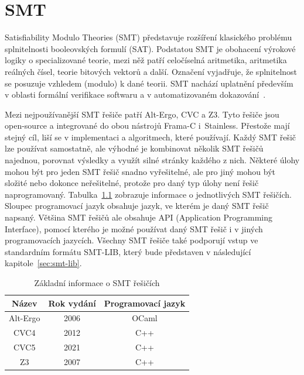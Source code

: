 \chapter{SMT}
\label{ch:smt}

Satisfiability Modulo Theories (SMT) představuje rozšíření klasického problému splnitelnosti booleovských formulí (SAT).
Podstatou SMT je obohacení výrokové logiky o specializované teorie,
mezi něž patří celočíselná aritmetika, aritmetika reálných čísel, teorie bitových vektorů a další.
Označení  vyjadřuje, že splnitelnost se posuzuje vzhledem (modulo) k dané teorii.
SMT nachází uplatnění především v oblasti formální verifikace softwaru a v automatizovaném dokazování~\cite{SMT}.

Mezi nejpoužívanější SMT řešiče patří Alt-Ergo, CVC a Z3.
Tyto řešiče jsou open-source a integrované do obou nástrojů Frama\mbox{-}C i~Stainless.
Přestože mají stejný cíl, liší se v implementaci a algoritmech, které používají.
Každý SMT řešič lze používat samostatně,
ale výhodné je kombinovat několik SMT řešičů najednou, porovnat výsledky a využít silné stránky každého z nich.
Některé úlohy mohou být pro jeden SMT řešič snadno vyřešitelné,
ale pro jiný mohou být složité nebo dokonce neřešitelné,
protože pro daný typ úlohy není řešič naprogramovaný.
Tabulka~\ref{tab:smt-resice} zobrazuje informace o jednotlivých SMT řešičích.
Sloupec programovací jazyk obsahuje jazyk, ve kterém je daný SMT řešič napsaný.
Většina SMT řešičů ale obsahuje API (Application Programming Interface),
pomocí kterého je možné používat daný SMT řešič i v jiných programovacích jazycích.
Všechny SMT řešiče také podporují vstup ve standardním formátu SMT-LIB,
který bude představen v následující kapitole~\ref{sec:smt-lib}.

\begin{table}[H]
    \centering
    \begin{tabular}{|c|c|c|}
        \hline
        \textbf{Název} & \textbf{Rok vydání}  & \textbf{Programovací jazyk} \\
        \hline
        Alt-Ergo       & 2006                 & OCaml                       \\
        CVC4           & 2012                 & C++                         \\
        CVC5           & 2021                 & C++                         \\
        Z3             & 2007                 & C++                         \\
        \hline
    \end{tabular}
    \caption{Základní informace o SMT řešičích}
    \label{tab:smt-resice}
\end{table}

